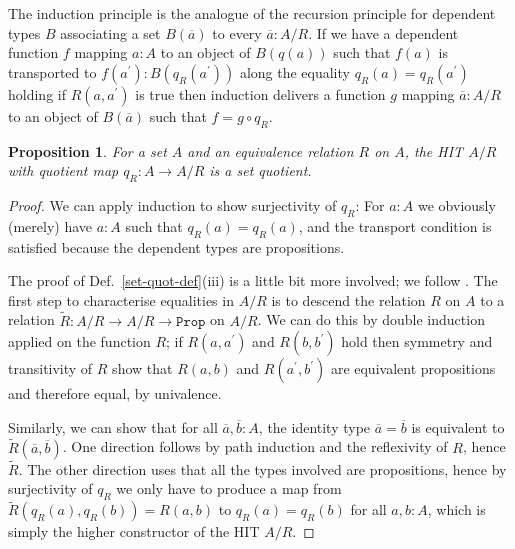 \documentclass{amsart}
\theoremstyle{plain}
\numberwithin{equation}{section} %
\numberwithin{figure}{section} %
\theoremstyle{plain}
\theoremstyle{plain}
\theoremstyle{plain}
\theoremstyle{plain}
\theoremstyle{plain}
\newtheorem{prop}[thm]{Proposition} %
\theoremstyle{plain}
\theoremstyle{remark}
\theoremstyle{remark}
\theoremstyle{remark}
\begin{document}
The induction principle is the analogue of the recursion principle for dependent types $B$ associating a set $B(\overline{a})$ to every $\overline{a} : A/R$. If we have a dependent function $f$ mapping $a : A$ to an object of $B(q(a))$ such that $f(a)$ is transported to $f(a^\prime) : B(q_R(a^\prime))$ along the equality $q_R(a) = q_R(a^\prime)$ holding if $R(a, a^\prime)$ is true then induction delivers a function $g$ mapping $\overline{a} : A/R$ to an object of $B(\overline{a})$ such that $f = g \circ q_R$. 

\begin{prop} \label{HIT-set-quot-prop}  %
For a set $A$ and an equivalence relation $R$ on $A$, the HIT $A/R$ with quotient map $q_R : A \rightarrow A/R$ is a set quotient.
\end{prop}
\begin{proof}
We can apply induction to show surjectivity of $q_R$: For $a : A$ we obviously (merely) have $a : A$ such that $q_R(a) = q_R(a)$, and the transport condition is satisfied because the dependent types are propositions.

The proof of Def.~\ref{set-quot-def}(iii) is a little bit more involved; we follow \cite[Lem.10.1.8]{HoTTBook}. The first step to characterise equalities in $A/R$ is to descend the relation $R$ on $A$ to a relation $\widetilde{R} : A/R \rightarrow A/R \rightarrow \mathtt{Prop}$ on $A/R$. We can do this by double induction applied on the function $R$; if $R(a,a^\prime)$ and $R(b, b^\prime)$ hold then symmetry and transitivity of $R$ show that $R(a,b)$ and $R(a^\prime, b^\prime)$ are equivalent propositions and therefore equal, by univalence.

Similarly, we can show that for all $\overline{a}, \overline{b} : A$, the identity type $\overline{a} = \overline{b}$ is equivalent to $\widetilde{R}(\overline{a}, \overline{b})$. One direction follows by path induction and the reflexivity of $R$, hence $\widetilde{R}$. The other direction uses that all the types involved are propositions, hence by surjectivity of $q_R$ we only have to produce a map from $\widetilde{R}(q_R(a), q_R(b)) = R(a, b)$ to $q_R(a) = q_R(b)$ for all $a, b : A$, which is simply the higher constructor of the HIT $A/R$. 
\end{proof}
\end{document}
